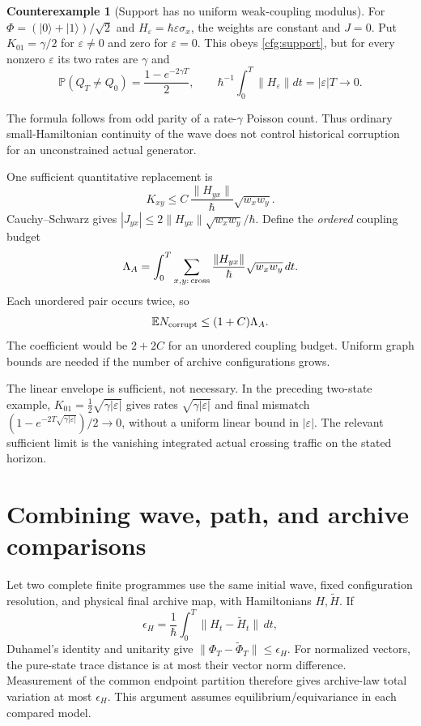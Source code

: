 \documentclass[11pt,oneside,openany]{book}
\theoremstyle{definition}
\newtheorem{counterexample}[theorem]{Counterexample}
\theoremstyle{remark}\newtheorem{remark}[theorem]{Remark}
\begin{document}
\begin{counterexample}[Support has no uniform weak-coupling modulus]
\label{cfg:discontinuity}
For $\Phi=(|0\rangle+|1\rangle)/\sqrt2$ and
$H_\varepsilon=\hbar\varepsilon\sigma_x$, the weights are constant and
$J=0$. Put $K_{01}=\gamma/2$ for $\varepsilon\ne0$ and zero for
$\varepsilon=0$. This obeys \eqref{cfg:support}, but for every nonzero
$\varepsilon$ its two rates are $\gamma$ and
\[
 \mathbb P(Q_T\ne Q_0)=\frac{1-e^{-2\gamma T}}2,
 \qquad \hbar^{-1}\int_0^T\|H_\varepsilon\|dt
       =|\varepsilon|T\longrightarrow0.
\]
\end{counterexample}
The formula follows from odd parity of a rate-$\gamma$ Poisson count.
Thus ordinary small-Hamiltonian continuity of the wave does not control
historical corruption for an unconstrained actual generator.

One sufficient quantitative replacement is
\begin{equation}
 K_{xy}\le C\,\frac{\|H_{yx}\|}{\hbar}\sqrt{w_xw_y}.
 \label{cfg:envelope}
\end{equation}
Cauchy--Schwarz gives
$|J_{yx}|\le2\|H_{yx}\|\sqrt{w_xw_y}/\hbar$.
Define the \emph{ordered} coupling budget
\[
 \Lambda_A=\int_0^T\sum_{x,y:\,{\rm cross}}
       \frac{\|H_{yx}\|}{\hbar}\sqrt{w_xw_y}\,dt.
\]
Each unordered pair occurs twice, so
\begin{equation}
 \mathbb E N_{\rm corrupt}\le(1+C)\Lambda_A.
 \label{cfg:envelopebound}
\end{equation}
The coefficient would be $2+2C$ for an unordered coupling budget.
Uniform graph bounds are needed if the number of archive configurations
grows.

The linear envelope is sufficient, not necessary. In the preceding
two-state example, $K_{01}=\frac12\sqrt{\gamma|\varepsilon|}$ gives
rates $\sqrt{\gamma|\varepsilon|}$ and final mismatch
$(1-e^{-2T\sqrt{\gamma|\varepsilon|}})/2\to0$, without a uniform
linear bound in $|\varepsilon|$. The relevant sufficient limit is the
vanishing integrated actual crossing traffic on the stated horizon.

\section{Combining wave, path, and archive comparisons}

Let two complete finite programmes use the same initial wave, fixed
configuration resolution, and physical final archive map, with
Hamiltonians $H,\widetilde H$. If
\[
 \epsilon_H=\frac1\hbar\int_0^T\|H_t-\widetilde H_t\|\,dt,
\]
Duhamel's identity and unitarity give
$\|\Phi_T-\widetilde\Phi_T\|\le\epsilon_H$.
For normalized vectors, the pure-state trace distance is at most their
vector norm difference. Measurement of the common endpoint partition
therefore gives archive-law total variation at most $\epsilon_H$.
This argument assumes equilibrium/equivariance in each compared model.
\end{document}

